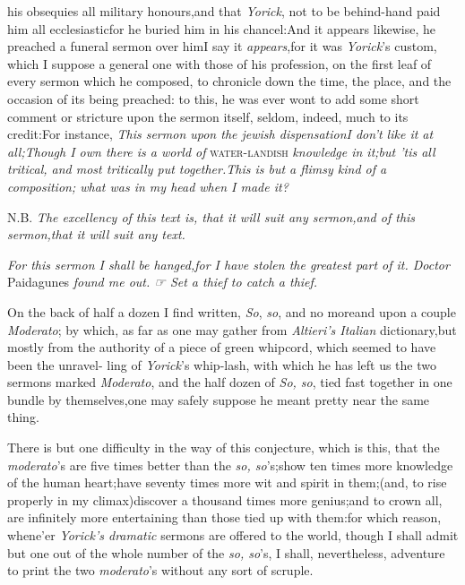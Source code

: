 \documentclass{article}
\begin{document}
\noindent{}
his obsequies all
military honours,\tsk and that \textit{Yorick}, not to be
behind-hand\tsk\break
paid him all ecclesiastic\tsk for he buried him
in his chancel:\tsk And it appears likewise, he preached a
funeral sermon over him\tsh I say it
\textit{appears},\tsk for it was \textit{Yorick}’s custom,
which I suppose a general one with those of his profession, on the
first leaf of every sermon which he composed, to chronicle down the
time, the place, and the occasion of its being preached: to this,
he was ever wont to add some short comment or stricture upon the
sermon itself, seldom, indeed, much to its credit:\tsk For
instance, \textit{This sermon upon the jewish dispensation\tsk I
don’t like it at all;\tsk Though I own there is a world
of} \textsc{water-landish} \textit{knowledge in it;\tsk but
’tis all tritical, and most tritically put
together.\tsk This is but a flimsy kind of a composition; what
was in my head when I made it?}

\tsh N.B. \textit{The excellency of this text is, that it
will suit any sermon,\tsk and of this sermon,\tsh that
it will suit any text.\tsh}

\tsh \textit{For this sermon I shall be
hanged,\break\tsk for I have stolen the greatest part of it. Doctor}
Paidagunes \textit{found me out. ☞  Set a thief to catch a
thief.\tsh}

On the back of half a dozen I find written, \textit{So}, \textit{so}, and no
more\tsh and upon a couple \textit{Moderato}; by which, as
far as one may gather from \textit{Altieri’s Italian}
dictionary,\tsk but mostly from the authority of a piece of green
whipcord, which seemed to have been the unravel- ling of
\textit{Yorick}’s whip-lash, with which he has left us the two
sermons marked \textit{Moderato}, and the half dozen of \textit{So,
so}, tied fast together in one bundle by themselves,\tsk one
may safely suppose he meant pretty near the same thing.

There is but one difficulty in the way of this conjecture, which
is this, that the \textit{moderato}’s are five times better
than the \textit{so, so}’s;\tsk show ten times more knowledge
of the human heart;\tsk have seventy times more wit and spirit in
them;\tsk (and, to rise properly in my climax)\tsk discover a
thousand times more genius;\break\tsk and to crown all, are infinitely
more entertaining than those tied up with them:\tsk for
which reason, whene’er \textit{Yorick’s dramatic} sermons
are offered to the world, though I shall admit but one out of the
whole number of the \textit{so, so}’s, I shall, nevertheless,
adventure to print the two \textit{moderato}’s without any sort
of scruple.
\end{document}
